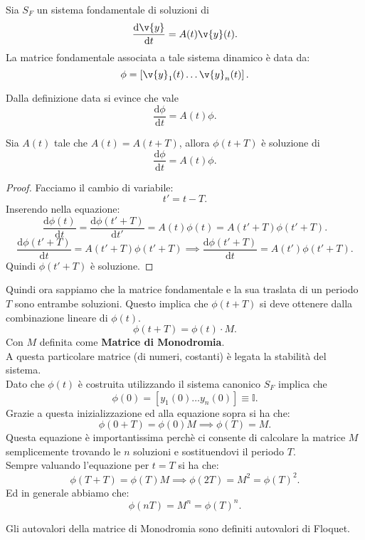 \begin{defn}
    Sia $S_F$ un sistema fondamentale di soluzioni di 
    \[
	\frac{\text{d} \v{y}}{\text{d} t} = A(t) \v{y}(t) 
    .\] 
    La matrice fondamentale associata a tale sistema dinamico è data da:
    \[
	\phi  = \left[\v{y}_1(t) \ldots \v{y}_n(t) \right]
    .\] 
\end{defn}
\noindent
Dalla definizione data si evince che vale 
\[
    \frac{\text{d} \phi}{\text{d} t} = A(t) \phi
.\] 
\begin{thm}[]
    Sia $A(t) $ tale che $A(t) = A(t+T)$,  allora $\phi (t+T)$  è soluzione di 
    \[
	\frac{\text{d} \phi}{\text{d} t} = A(t) \phi
    .\] 
\end{thm}
\noindent
\begin{proof}
    Facciamo il cambio di variabile:
    \[
        t' = t - T
    .\] Inserendo nella equazione:
    \[
	\frac{\text{d} \phi (t) }{\text{d} t} = \frac{\text{d} \phi (t' + T) }{\text{d} t'} = A(t) \phi (t) = 
	A(t'+T) \phi (t' + T) 
    .\] 
    \[
	\frac{\text{d} \phi (t'+T) }{\text{d} t} = A(t'+T) \phi (t'+T) \implies 
	\frac{\text{d} \phi (t' + T) }{\text{d} t} = A(t') \phi (t'+T)
    .\] 
    Quindi $\phi (t'+T)$ è soluzione.
\end{proof}
\noindent 
Quindi ora sappiamo che la matrice fondamentale e la sua traslata di un periodo $T$ sono entrambe soluzioni. Questo implica che $\phi (t+T)$ si deve ottenere dalla combinazione lineare di $\phi (t) $.
\[
    \phi (t+T) = \phi (t) \cdot M
.\] 
Con $M$  definita come \textbf{Matrice di Monodromia}.\\
A questa particolare matrice (di numeri, costanti) è legata la stabilità del sistema.\\
Dato che $\phi (t) $  è costruita utilizzando il sistema canonico $S_F$ implica che 
\[
    \phi (0) = \left[y_1(0) \ldots y_n(0) \right] \equiv \mathbb{I}
.\] 
Grazie a questa inizializzazione ed alla equazione sopra si ha che:
\[
    \phi (0 + T) = \phi (0) M \implies  \phi (T) = M
.\] 
Questa equazione è importantissima perchè ci consente di calcolare la matrice $M$  semplicemente trovando le $n$  soluzioni e sostituendovi il periodo $T$.\\
Sempre valuando l'equazione per $t = T$  si ha che:
\[
    \phi (T + T) = \phi (T) M \implies\phi (2T) = M^2=\phi (T) ^2
.\] 
Ed in generale abbiamo che:
\[
    \phi (nT) = M^n = \phi (T)^n 
.\] 
\begin{defn}
    Gli autovalori della matrice di Monodromia sono definiti autovalori di Floquet.
\end{defn}

